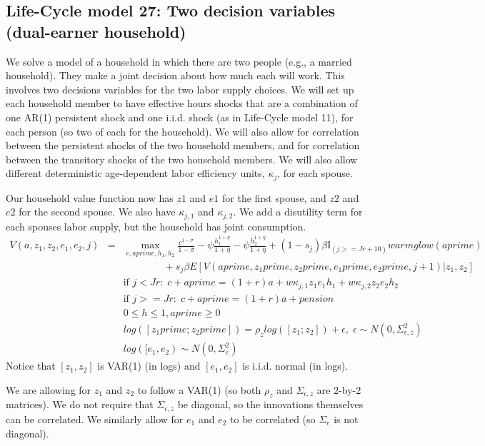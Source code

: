 \subsection{Life-Cycle model 27: Two decision variables (dual-earner household)}
We solve a model of a household in which there are two people (e.g., a married household). They make a joint decision about how much each will work. This involves two decisions variables for the two labor supply choices. We will set up each household member to have effective hours shocks that are a combination of one AR(1) persistent shock and one i.i.d. shock (as in Life-Cycle model 11), for each person (so two of each for the household). We will also allow for correlation between the persistent shocks of the two household members, and for correlation between the transitory shocks of the two household members. We will also allow different deterministic age-dependent labor efficiency units, $\kappa_j$, for each spouse.

Our household value function now has $z1$ and $e1$ for the first spouse, and $z2$ and $e2$ for the second spouse. We also have $\kappa_{j,1}$ and  $\kappa_{j,2}$. We add a disutility term for each spouses labor supply, but the household has joint consumption.
\begin{eqnarray*}
 V(a,z_1,z_2,e_1,e_2,j)&=& \max_{c,aprime,h_1,h_2} \frac{c^{1-\sigma}}{1-\sigma} - \psi \frac{h_1^{1+\eta}}{1+\eta}- \psi \frac{h_2^{1+\eta}}{1+\eta} + (1-s_j)\beta  \mathbb{I}_{(j>=Jr+10)} warmglow(aprime) \\
 && \quad \quad \quad \quad+ s_j \beta E[V(aprime,z_1prime,z_2prime,e_1prime,e_2prime,j+1)|z_1,z_2] \\
&& \text{if }j<Jr: \; c+aprime=(1+r)a+w \kappa_{j,1}  z_1 e_1 h_1+w \kappa_{j,2}  z_2 e_2 h_2 \\
&& \text{if }j>=Jr: \; c+aprime=(1+r)a +pension\\
&& 0\leq h \leq 1, aprime\geq 0 \\
&& log([z_1prime; z_2prime])=\rho_{z} log([z_1; z_2]) + \epsilon, \; \epsilon \sim N(0,\Sigma_{\epsilon,z}^2) \\
&& log([e_1,e_2) \sim N(0,\Sigma_{e}^2)
\end{eqnarray*}
Notice that $[z_1,z_2]$ is VAR(1) (in logs) and $[e_1,e_2]$ is i.i.d. normal (in logs).

We are allowing for $z_1$ and $z_2$ to follow a VAR(1) (so both $\rho_z$ and $\Sigma_{\epsilon,z}$ are 2-by-2 matrices). We do not require that $\Sigma_{\epsilon,z}$ be diagonal, so the innovations themselves can be correlated. We similarly allow for $e_1$ and $e_2$ to be correlated (so $\Sigma_{e}$ is not diagonal).

